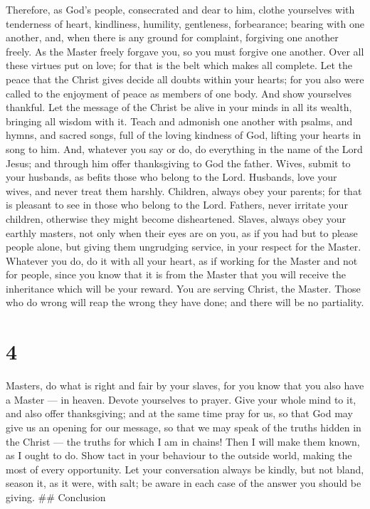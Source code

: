  Therefore, as God's people, consecrated and dear to him,
clothe yourselves with tenderness of heart, kindliness, humility,
gentleness, forbearance;  bearing with one another, and,
when there is any ground for complaint, forgiving one another freely. As
the Master freely forgave you, so you must forgive one another.
 Over all these virtues put on love; for that is the belt
which makes all complete.  Let the peace that the Christ
gives decide all doubts within your hearts; for you also were called to
the enjoyment of peace as members of one body. And show yourselves
thankful.  Let the message of the Christ be alive in your
minds in all its wealth, bringing all wisdom with it. Teach and admonish
one another with psalms, and hymns, and sacred songs, full of the loving
kindness of God, lifting your hearts in song to him.  And,
whatever you say or do, do everything in the name of the Lord Jesus; and
through him offer thanksgiving to God the father.  Wives,
submit to your husbands, as befits those who belong to the Lord.
 Husbands, love your wives, and never treat them harshly.
 Children, always obey your parents; for that is pleasant
to see in those who belong to the Lord.  Fathers, never
irritate your children, otherwise they might become disheartened.
 Slaves, always obey your earthly masters, not only when
their eyes are on you, as if you had but to please people alone, but
giving them ungrudging service, in your respect for the Master.
 Whatever you do, do it with all your heart, as if working
for the Master and not for people,  since you know that it
is from the Master that you will receive the inheritance which will be
your reward. You are serving Christ, the Master.  Those who
do wrong will reap the wrong they have done; and there will be no
partiality.

\hypertarget{section-3}{%
\section{4}\label{section-3}}

 Masters, do what is right and fair by your slaves, for you
know that you also have a Master --- in heaven.  Devote
yourselves to prayer. Give your whole mind to it, and also offer
thanksgiving;  and at the same time pray for us, so that God
may give us an opening for our message, so that we may speak of the
truths hidden in the Christ --- the truths for which I am in chains!
 Then I will make them known, as I ought to do. 
Show tact in your behaviour to the outside world, making the most of
every opportunity.  Let your conversation always be kindly,
but not bland, season it, as it were, with salt; be aware in each case
of the answer you should be giving. \#\# Conclusion

